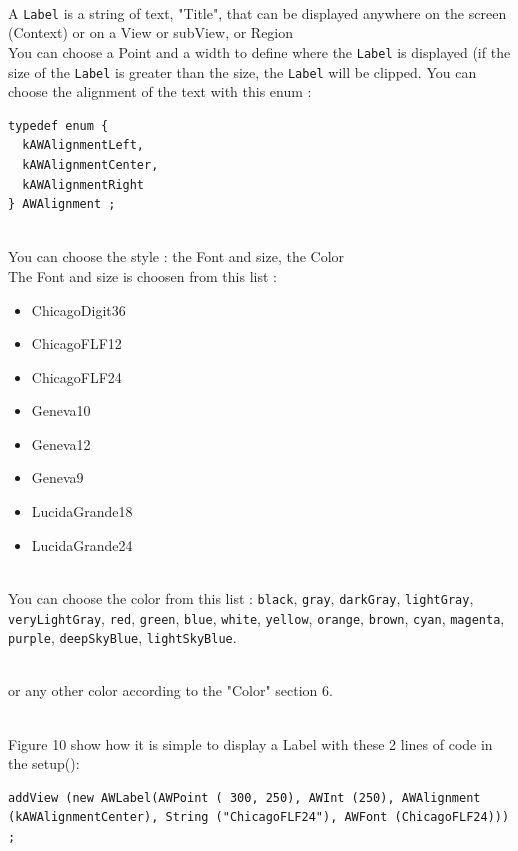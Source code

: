 \documentclass[a4paper,11pt]{extarticle}
\begin{document}
~\\ A \texttt{Label} is a string of text, "Title", that can be displayed anywhere on the screen (Context) or on a View or subView, or Region
~\\ You can choose a Point and a width to define where the \texttt{Label} is displayed (if the size of the \texttt{Label} is greater than the size, the \texttt{Label} will be clipped. You can choose the alignment of the text with this enum :

\begin{lstlisting}[language=Arduinonl]
typedef enum {
  kAWAlignmentLeft,
  kAWAlignmentCenter,
  kAWAlignmentRight
} AWAlignment ;
\end{lstlisting}

~\\ You can choose the style : the Font and size, the Color 
~\\ The Font and size is choosen from this list :
\begin{itemize}
\item ChicagoDigit36
\item ChicagoFLF12
\item ChicagoFLF24
\item Geneva10
\item Geneva12
\item Geneva9
\item LucidaGrande18
\item LucidaGrande24
\end{itemize}

~\\ You can choose the color from this list : \texttt{black}, \texttt{gray}, \texttt{darkGray}, \texttt{lightGray}, \texttt{veryLightGray}, \texttt{red}, \texttt{green}, \texttt{blue}, \texttt{white}, \texttt{yellow}, \texttt{orange}, \texttt{brown}, \texttt{cyan}, \texttt{magenta}, \texttt{purple}, \texttt{deepSkyBlue}, \texttt{lightSkyBlue}.

~\\ or any other color according to the "Color" section 6.

~\\ Figure 10 show how it is simple to display a Label with these 2 lines of code in the setup():

\begin{lstlisting}[language=Arduinonl]
  addView (new AWLabel(AWPoint ( 300, 250), AWInt (250), AWAlignment (kAWAlignmentCenter), String ("ChicagoFLF24"), AWFont (ChicagoFLF24))) ;
\end{lstlisting}
\end{document}
